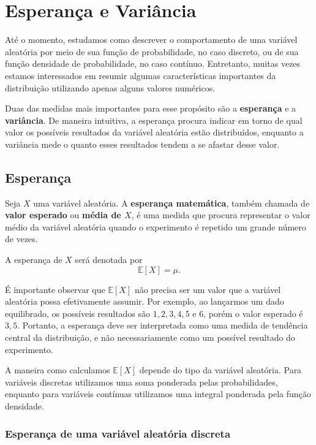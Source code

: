 \section{Esperança e Variância}

Até o momento, estudamos como descrever o comportamento de uma variável aleatória por meio de sua função de probabilidade, no caso discreto, ou de sua função densidade de probabilidade, no caso contínuo. Entretanto, muitas vezes estamos interessados em resumir algumas características importantes da distribuição utilizando apenas alguns valores numéricos.

Duas das medidas mais importantes para esse propósito são a \textbf{esperança} e a \textbf{variância}. De maneira intuitiva, a esperança procura indicar em torno de qual valor os possíveis resultados da variável aleatória estão distribuídos, enquanto a variância mede o quanto esses resultados tendem a se afastar desse valor.

\subsection{Esperança}

Seja $X$ uma variável aleatória. A \textbf{esperança matemática}, também chamada de \textbf{valor esperado} ou \textbf{média de $X$}, é uma medida que procura representar o valor médio da variável aleatória quando o experimento é repetido um grande número de vezes.

A esperança de $X$ será denotada por
\begin{equation}
\mathbb{E}[X]=\mu.
\end{equation}

É importante observar que $\mathbb{E}[X]$ não precisa ser um valor que a variável aleatória possa efetivamente assumir. Por exemplo, ao lançarmos um dado equilibrado, os possíveis resultados são $1,2,3,4,5$ e $6$, porém o valor esperado é $3,5$. Portanto, a esperança deve ser interpretada como uma medida de tendência central da distribuição, e não necessariamente como um possível resultado do experimento.

A maneira como calculamos $\mathbb{E}[X]$ depende do tipo da variável aleatória. Para variáveis discretas utilizamos uma soma ponderada pelas probabilidades, enquanto para variáveis contínuas utilizamos uma integral ponderada pela função densidade.

\subsubsection{Esperança de uma variável aleatória discreta}

